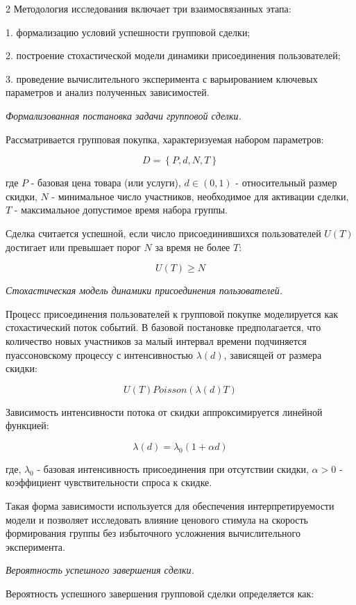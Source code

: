 \begin{multicols}{2}
Методология исследования включает три взаимосвязанных этапа:

1. формализацию условий успешности групповой сделки;

2. построение стохастической модели динамики присоединения пользователей;

3. проведение вычислительного эксперимента с варьированием ключевых
параметров и анализ полученных зависимостей.

\emph{Формализованная постановка задачи групповой сделки.}

Рассматривается групповая покупка, характеризуемая набором параметров:

\begin{equation}
D = \left\{ P,d,N,T \right\}
\end{equation}

где \(P\) - базовая цена товара (или услуги), \(d \in (0,1)\) -
относительный размер скидки, \(N\) - минимальное число участников,
необходимое для активации сделки, \(T\) - максимальное допустимое время
набора группы.

Сделка считается успешной, если число присоединившихся пользователей
\(U(T)\) достигает или превышает порог \(N\) за время не более \(T\):

\begin{equation}
U(T) \geq N
\end{equation}

\emph{Стохастическая модель динамики присоединения пользователей.}

Процесс присоединения пользователей к групповой покупке моделируется как
стохастический поток событий. В базовой постановке предполагается, что
количество новых участников за малый интервал времени подчиняется
пуассоновскому процессу с интенсивностью \(\lambda(d)\), зависящей от
размера скидки:

\begin{equation}
U(T) Poisson(\lambda(d)T)
\end{equation}

Зависимость интенсивности потока от скидки аппроксимируется линейной
функцией:

\begin{equation}
\lambda(d) = \lambda_{0}(1 + \alpha d)
\end{equation}

где, \(\lambda_{0}\) - базовая интенсивность присоединения при
отсутствии скидки, \(\alpha > 0\) - коэффициент чувствительности спроса
к скидке.

Такая форма зависимости используется для обеспечения интерпретируемости
модели и позволяет исследовать влияние ценового стимула на скорость
формирования группы без избыточного усложнения вычислительного
эксперимента.

\emph{Вероятность успешного завершения сделки.}

Вероятность успешного завершения групповой сделки определяется как:
\end{multicols}
